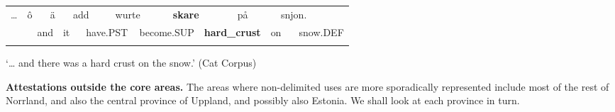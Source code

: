 \begin{tabular}{llllllllllllllll}
\lsptoprule
… & \multicolumn{2}{l}{ô

} & \multicolumn{2}{l}{ä

} & \multicolumn{2}{l}{add

} & \multicolumn{2}{l}{wurte

} & \multicolumn{2}{l}{{\bfseries skare}

} & \multicolumn{2}{l}{på

} & \multicolumn{2}{l}{snjon.

} & \\
\multicolumn{2}{l}{} & \multicolumn{2}{l}{and

} & \multicolumn{2}{l}{it

} & \multicolumn{2}{l}{have.PST

} & \multicolumn{2}{l}{become.SUP

} & \multicolumn{2}{l}{{\bfseries hard\_crust}

} & \multicolumn{2}{l}{on

} & \multicolumn{2}{l}{snow.DEF

}\\
\lspbottomrule
\end{tabular}

\begin{styleTranslation}
‘… and there was a hard crust on the snow.’ (Cat Corpus)

\end{styleTranslation}

\begin{styleBodyTextFirst}
\textbf{Attestations outside the core areas.} The areas where non-delimited uses are more sporadically represented include most of the rest of Norrland, and also the central province of Uppland, and possibly also Estonia. We shall look at each province in turn.

\end{styleBodyTextFirst}

